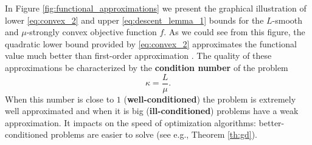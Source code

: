In Figure \ref{fig:functional_approximations} we present the graphical illustration of lower \eqref{eq:convex_2} and upper \eqref{eq:descent_lemma_1} bounds for the $L$-smooth and $\mu$-strongly convex objective function $f$. {As we could see from this figure, the quadratic lower bound provided by \eqref{eq:convex_2} approximates the functional value much better than  first-order approximation }. The quality of these approximations  be characterized by the {\textbf{condition number}} of the problem
$$
\kappa =  \frac{L}{\mu}.
$$
When this number is close to $1$ ({\textbf{well-conditioned}}) the problem is extremely well approximated and when it is big ({\textbf{ill-conditioned}}) problems have a weak approximation. It impacts on the speed of optimization algorithms: better-conditioned problems are easier to solve (see e.g., Theorem \ref{th:gd}).

